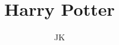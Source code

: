\documentclass{article}%
\title{Harry Potter}%
\author{JK }%
\begin{document}
%
\normalsize%
\maketitle%
\end{document}
